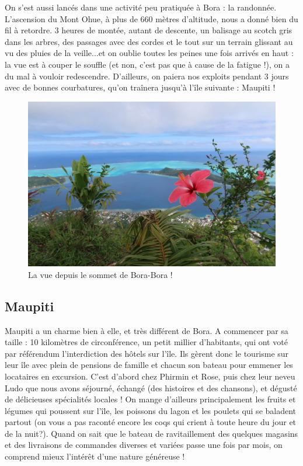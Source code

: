 On s'est aussi lancés dans une activité peu pratiquée à Bora : la
randonnée. L'ascension du Mont Ohue, à plus de 660 mètres d'altitude,
nous a donné bien du fil à retordre. 3 heures de montée, autant de
descente, un balisage au scotch gris dans les arbres, des passages avec
des cordes et le tout sur un terrain glissant au vu des pluies de la
veille...et on oublie toutes les peines une fois arrivés en haut : la
vue est à couper le souffle (et non, c'est pas que à cause de la fatigue
!), on a du mal à vouloir redescendre. D'ailleurs, on paiera nos
exploits pendant 3 jours avec de bonnes courbatures, qu'on traînera
jusqu'à l'île suivante : Maupiti !

\begin{figure}
\centering
\includegraphics{images/20180820_borarando.JPG}
\caption{La vue depuis le sommet de Bora-Bora !}
\end{figure}

\hypertarget{maupiti}{%
\subsection{Maupiti}\label{maupiti}}

Maupiti a un charme bien à elle, et très différent de Bora. A commencer
par sa taille : 10 kilomètres de circonférence, un petit millier
d'habitants, qui ont voté par référendum l'interdiction des hôtels sur
l'île. Ils gèrent donc le tourisme sur leur île avec plein de pensions
de famille et chacun son bateau pour emmener les locataires en
excursion. C'est d'abord chez Phirmin et Rose, puis chez leur neveu Ludo
que nous avons séjourné, échangé (des histoires et des chansons), et
dégusté de délicieuses spécialités locales ! On mange d'ailleurs
principalement les fruits et légumes qui poussent sur l'île, les
poissons du lagon et les poulets qui se baladent partout (on vous a pas
raconté encore les coqs qui crient à toute heure du jour et de la
nuit?). Quand on sait que le bateau de ravitaillement des quelques
magasins et des livraisons de commandes diverses et variées passe une
fois par mois, on comprend mieux l'intérêt d'une nature généreuse !

